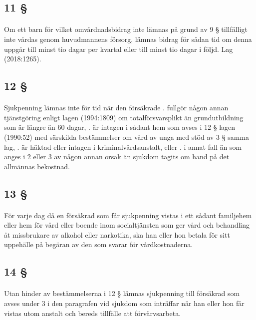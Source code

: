 \documentclass[a4paper,notitlepage,openany,10pt]{book}
\begin{document}
\subsection*{11 §}
\paragraph*{}
Om ett barn för vilket omvårdnadsbidrag inte lämnas på grund av 9 § tillfälligt inte vårdas genom huvudmannens försorg, lämnas bidrag för sådan tid om denna uppgår till minst tio dagar per kvartal eller till minst tio dagar i följd.
Lag (2018:1265).
\subsection*{12 §}
\paragraph*{}
Sjukpenning lämnas inte för tid när den försäkrade
. fullgör någon annan tjänstgöring enligt lagen (1994:1809) om totalförsvarsplikt än grundutbildning som är längre än 60 dagar,
. är intagen i sådant hem som avses i 12 § lagen (1990:52) med särskilda bestämmelser om vård av unga med stöd av 3 § samma lag,
. är häktad eller intagen i kriminalvårdsanstalt, eller
. i annat fall än som anges i 2 eller 3 av någon annan orsak än sjukdom tagits om hand på det allmännas bekostnad.
\subsection*{13 §}
\paragraph*{}
För varje dag då en försäkrad som får sjukpenning vistas i ett sådant familjehem eller hem för vård eller boende inom socialtjänsten som ger vård och behandling åt missbrukare av alkohol eller narkotika, ska han eller hon betala för sitt uppehälle på begäran av den som svarar för vårdkostnaderna.
\subsection*{14 §}
\paragraph*{}
Utan hinder av bestämmelserna i 12 § lämnas sjukpenning till försäkrad som avses under 3 i den paragrafen vid sjukdom som inträffar när han eller hon får vistas utom anstalt och bereds tillfälle att förvärvsarbeta.
\end{document}
